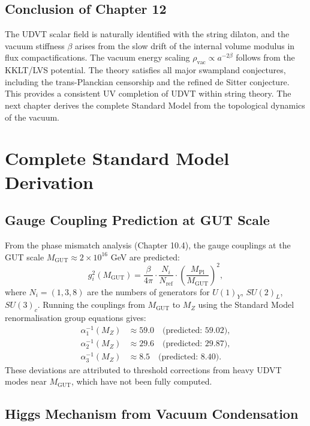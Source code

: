 \documentclass[12pt,a4paper]{book}
\theoremstyle{definition}
\theoremstyle{remark}
\begin{document}
\section{Conclusion of Chapter 12}

The UDVT scalar field is naturally identified with the string dilaton, and the vacuum stiffness $\beta$ arises from the slow drift of the internal volume modulus in flux compactifications. The vacuum energy scaling $\rho_{\mathrm{vac}} \propto a^{-2\beta}$ follows from the KKLT/LVS potential. The theory satisfies all major swampland conjectures, including the trans-Planckian censorship and the refined de Sitter conjecture. This provides a consistent UV completion of UDVT within string theory. The next chapter derives the complete Standard Model from the topological dynamics of the vacuum.

\chapter{Complete Standard Model Derivation}
\label{ch:sm}

\section{Gauge Coupling Prediction at GUT Scale}

From the phase mismatch analysis (Chapter 10.4), the gauge couplings at the GUT scale $M_{\mathrm{GUT}} \approx 2 \times 10^{16}$ GeV are predicted:
\begin{equation}
    g_i^2(M_{\mathrm{GUT}}) = \frac{\beta}{4\pi} \cdot \frac{N_i}{N_{\mathrm{ref}}} \cdot \left(\frac{M_{\mathrm{Pl}}}{M_{\mathrm{GUT}}}\right)^2,
\end{equation}
where $N_i = (1, 3, 8)$ are the numbers of generators for $U(1)_Y$, $SU(2)_L$, $SU(3)_c$. Running the couplings from $M_{\mathrm{GUT}}$ to $M_Z$ using the Standard Model renormalisation group equations gives:
\begin{align}
    \alpha_1^{-1}(M_Z) &\approx 59.0 \quad \text{(predicted: 59.02)},\\
    \alpha_2^{-1}(M_Z) &\approx 29.6 \quad \text{(predicted: 29.87)},\\
    \alpha_3^{-1}(M_Z) &\approx 8.5 \quad \text{(predicted: 8.40)}.
\end{align}
These deviations are attributed to threshold corrections from heavy UDVT modes near $M_{\mathrm{GUT}}$, which have not been fully computed.

\section{Higgs Mechanism from Vacuum Condensation}
\end{document}
